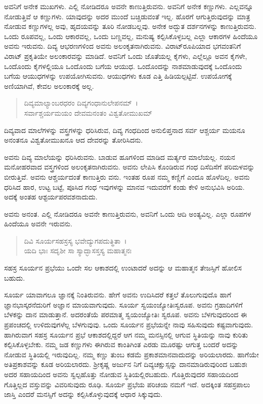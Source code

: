 ಅವನಿಗೆ ಅನೇಕ ಮುಖಗಳು. ಎಲ್ಲಿ ನೋಡಿದರೂ ಅವನೇ ಕಾಣುತ್ತಿರುವನು. ಅವನಿಗೆ ಅನೇಕ ಕಣ್ಣುಗಳು. ಎಲ್ಲವನ್ನೂ ನೋಡುತ್ತಿವೆ ಆ ಕಣ್ಣುಗಳು. ಯಾವುದನ್ನು ಅದರ ಮುಂದೆ ಬಚ್ಚಿಡುವಂತೆ ಇಲ್ಲ. ಹೊರಗೆ ಆಗುತ್ತಿರುವುದನ್ನು ಮಾತ್ರ ನೋಡುವ ಕಣ್ಣುಗಳಲ್ಲ ಅವು, ಹೃದಯವನ್ನು ತೂರಿ ನೋಡಬಲ್ಲವು. ಅನೇಕ ಅದ್ಭುತ ದರ್ಶನಗಳನ್ನು ಕಾಣುತ್ತಿರುವನು. ಒಂದು ರೂಪವಲ್ಲ, ಒಂದು ಆಕಾರವಲ್ಲ, ಒಂದು ಬಣ್ಣವಲ್ಲ, ಮನುಷ್ಯ ಕಲ್ಪಿಸಿಕೊಳ್ಳಬಲ್ಲ ಎಲ್ಲಾ ಆಕಾರಗಳ ಹಿಂದೆಯೂ ಅವನು ಇರುವನು. ದಿವ್ಯ ಆಭರಣಗಳಿಂದ ಅವನು ಅಲಂಕೃತನಾಗಿರುವನು. ವಿರಾಟ್​ರೂಪಿಯಾದ ಭಗವಂತನಿಗೆ ವಿರಾಟ್ ಪ್ರಕೃತಿಯೇ ಅಲಂಕಾರವನ್ನು ಮಾಡಿದೆ. ಅವನಿಗೆ ಒಂದು ಜೊತೆಯಲ್ಲ ಕೈಗಳು, ಎಲ್ಲೆಲ್ಲೂ ಅವನ ಕೈಗಳೇ, ಒಂದೊಂದು ಕೈಗಳಲ್ಲಿಯೂ ಒಂದೊಂದು ಬಗೆಯ ಆಯುಧ. ಒಂದೊಂದನ್ನು ನಾಶಮಾಡುವುದಕ್ಕೆ ಒಂದೊಂದು ಬಗೆಯ ಆಯುಧಗಳನ್ನು ಉಪಯೋಗಿಸುವನು. ಆಯುಧಗಳು ಕೂಡ ಎತ್ತಿ ಹಿಡಿಯಲ್ಪಟ್ಟಿವೆ. ಉಪಯೋಗಕ್ಕೆ ಅಣಿಯಾಗಿವೆ, ಕೇವಲ ಅಲಂಕಾರಕ್ಕೆ ಅಲ್ಲ.

\begin{verse}
ದಿವ್ಯಮಾಲ್ಯಾಂಬರಧರಂ ದಿವ್ಯಗಂಧಾನುಲೇಪನಮ್~।\\ಸರ್ವಾಶ್ಚರ್ಯಮಯಂ ದೇವಮನಂತಂ ವಿಶ್ವತೋಮುಖಮ್ 
\end{verse}

{\small ದಿವ್ಯವಾದ ಮಾಲೆಗಳನ್ನು ವಸ್ತ್ರಗಳನ್ನು ಧರಿಸಿರುವ, ದಿವ್ಯ ಗಂಧದಿಂದ ಅನುಲಿಪ್ತನಾದ ಸರ್ವ ಆಶ್ಚರ್ಯ ಮಯನೂ ಅನಂತನೂ ವಿಶ್ವತೋಮುಖನೂ ಆದ ದೇವರನ್ನು ತೋರಿಸಿದನು.}

ಅವನು ದಿವ್ಯ ಮಾಲೆಯನ್ನು ಧರಿಸಿರುವನು. ಬಾಡುವ ಹೂಗಳಿಂದ ಮಾಡಿದ ಮರ್ತ್ಯರ ಮಾಲೆಯಲ್ಲ. ನಯನ ಮನೋಹರವಾದ ವಸ್ತ್ರಗಳಿಂದ ಅಲಂಕೃತನಾಗಿರುವನು. ಅವನು ಲೇಪಿಸಿ ಕೊಂಡಿರುವ ಗಂಧ ದಿಸೆದಿಸೆಗೆ ಪರಿಮಳವನ್ನು ಬೀರುತ್ತಿವೆ. ಅವನು ಆಶ್ಚರ್ಯದಂತೆ ಕಾಣುತ್ತಿರು ವನು. ಇಂತಹ ರೂಪ ನಮ್ಮ ಕಣ್ಣಿಗೆ ಎಂದೂ ಹೊಳೆದಿಲ್ಲ. ಅವನು ಧರಿಸಿದ ಹಾರ, ಉಟ್ಟ ಬಟ್ಟೆ, ಪೂಸಿದ ಗಂಧ ಇವುಗಳನ್ನು ಮಾನವ ಇದುವರೆಗೆ ಕಂಡು ಕೇಳಿ ಅನುಭವಿಸಿ ಅರಿಯ. ಅದಕ್ಕೆ ಅಂತಹ ಆಶ್ಟರ್ಯಪರವಶನಾದುದು.

ಅವನು ಅನಂತ. ಎಲ್ಲಿ ನೋಡಿದರೂ ಅವನೇ ಕಾಣುತ್ತಿರುವನು, ಅವನಿಗೆ ಒಂದು ಆದಿ ಅಂತ್ಯವಿಲ್ಲ. ಎಲ್ಲಾ ರೂಪಗಳ ಹಿಂದೆಯೂ ಅವನೇ ಇರುವನು.

\begin{verse}
ದಿವಿ ಸೂರ್ಯಸಹಸ್ರಸ್ಯ ಭವೇದ್ಯುಗಪದುತ್ಥಿತಾ~।\\ಯದಿ ಭಾಃ ಸದೃಶೀ ಸಾ ಸ್ಯಾದ್ಭಾಸಸ್ತಸ್ಯ ಮಹಾತ್ಮನಃ 
\end{verse}

{\small ಸಹಸ್ರ ಸೂರ್ಯನ ಪ್ರಭೆಯು ಒಂದೇ ಸಲ ಆಕಾಶದಲ್ಲಿ ಉಂಟಾದರೆ ಅದನ್ನು ಆ ಮಹಾತ್ಮನ ತೇಜಸ್ಸಿಗೆ ಹೋಲಿಸ ಬಹುದು.}

ಸೂರ್ಯ ಯಾವಾಗಲೂ ಜ್ಞಾನಕ್ಕೆ ನಿಂತಿರುವನು. ಹೇಗೆ ಅವನು ಉದಿಸಿದರೆ ಕತ್ತಲೆ ತೊಲುಗುವುದೊ ಹಾಗೆ ಜ್ಞಾನಭಾಸ್ಕರನೆದುರಿಗೆ ಅಜ್ಞಾನ ಮಾಯವಾಗುವುದು. ಸೂರ್ಯ ಸ್ವಯಂಜ್ಯೋತಿಃಸ್ವರೂಪ. ಅವನು ಗ್ರಹಾದಿಗಳಿಗೆ ಬೆಳಕನ್ನು ದಾನ ಮಾಡುತ್ತಾನೆ. ಅದರಂತೆಯೆ ಪರಮಾತ್ಮ ಸ್ವಯಂಜ್ಯೋತಿಃ ಸ್ವರೂಪ. ಅವನು ಬೆಳಗುವುದರಿಂದ ಈ ಪ್ರಪಂಚದಲ್ಲಿ ಉಳಿದುವುಗಳೆಲ್ಲ ಬೆಳಗುವುವು. ಒಂದು ಸೂರ್ಯನ ಪ್ರಭೆಯನ್ನೇ ನಾವು ಸಹಿಸುವುದು ಕಷ್ಟವಾಗುವುದು. ಹಾಗಿರುವಾಗ ಸಹಸ್ರ ಸೂರ್ಯನ ಪ್ರಭೆ ಆಕಾಶದಲ್ಲಿದ್ದರೆ ಆಗ ನಮ್ಮ ಮನಸ್ಸಿನಲ್ಲಿ ಆಗುವ ಸ್ಥಿತಿಯನ್ನು ನಾವು ಕುರಿತು ಕಲ್ಪಿಸಿಕೊಳ್ಳಬೇಕು. ನಮ್ಮ ಜಡ ಕಣ್ಣುಗಳು ಈಗಿರುವ ಕಾಂತಿಗಿಂತ ಎರಡು ಮೂರಷ್ಟು ಆಗುತ್ತ ಬಂದರೆ ಅದನ್ನು ನೋಡುವ ಸ್ಥಿತಿಯಲ್ಲಿ ಇರುವುದಿಲ್ಲ. ನಮ್ಮ ಕಣ್ಣು ತುಂಬ ಕಡಮೆ ಪ್ರಕಾಶಮಾನವಾದುದನ್ನು ಅರಿಯಲಾರದು. ಹಾಗೆಯೇ ಅತಿಪ್ರಕಾಶವನ್ನು ಕೂಡ ಅರಿಯಲಾರದು. ಶ‍್ರೀಕೃಷ್ಣ ಅರ್ಜುನ ನಿಗೆ ದಿವ್ಯಚಕ್ಷುಸ್ಸನ್ನು ದಾನಮಾಡಿರುವುರಿಂದ ಬಹುಶಃ ಅದರ ಸಹಾಯದಿಂದ ಅವನು ಸ್ವಲ್ಪಹೊತ್ತು ನೋಡುವ ಸ್ಥಿತಿಯಲ್ಲಿರಬಹುದು. ಗೊತ್ತಿರುವುದರ ಸಹಾಯದಿಂದ ಗೊತ್ತಿಲ್ಲದ ವಸ್ತುವನ್ನು ವಿವರಿಸುವುದು ರೂಢಿ. ಸೂರ್ಯ ಪ್ರಭೆಯ ಪರಿಚಯ ನಮಗೆ ಇದೆ. ಅದಕ್ಕಿಂತ ಸಹಸ್ರಪಾಲು ಜಾಸ್ತಿ ಎಂದರೆ ಮನಸ್ಸಿಗೆ ಅದನ್ನು ಕಲ್ಪಿಸಿಕೊಳ್ಳುವುದಕ್ಕೆ ಆಧಾರ ಸಿಕ್ಕುವುದು.

